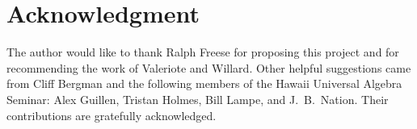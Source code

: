 









\section*{Acknowledgment}
The author would like to thank
Ralph Freese for proposing this project and for recommending 
the work of Valeriote and Willard.
Other helpful suggestions came from Cliff Bergman and the
following members of the Hawaii Universal Algebra 
Seminar: Alex Guillen, Tristan Holmes, Bill Lampe, and J.~B.~Nation.
Their contributions are gratefully acknowledged.



%
%
%

